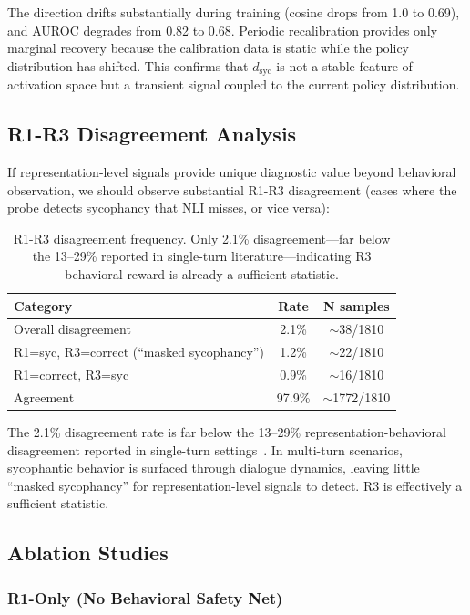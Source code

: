 \documentclass[11pt,a4paper]{article}
\begin{document}
The direction drifts substantially during training (cosine drops from 1.0 to 0.69), and AUROC degrades from 0.82 to 0.68. Periodic recalibration provides only marginal recovery because the calibration data is static while the policy distribution has shifted. This confirms that $d_\text{syc}$ is not a stable feature of activation space but a transient signal coupled to the current policy distribution.

\subsection{R1-R3 Disagreement Analysis}

If representation-level signals provide unique diagnostic value beyond behavioral observation, we should observe substantial R1-R3 disagreement (cases where the probe detects sycophancy that NLI misses, or vice versa):

\begin{table}[h]
\centering
\small
\begin{tabular}{lcc}
\toprule
\textbf{Category} & \textbf{Rate} & \textbf{N samples} \\
\midrule
Overall disagreement & 2.1\% & $\sim$38/1810 \\
R1=syc, R3=correct (``masked sycophancy'') & 1.2\% & $\sim$22/1810 \\
R1=correct, R3=syc & 0.9\% & $\sim$16/1810 \\
Agreement & 97.9\% & $\sim$1772/1810 \\
\bottomrule
\end{tabular}
\caption{R1-R3 disagreement frequency. Only 2.1\% disagreement---far below the 13--29\% reported in single-turn literature---indicating R3 behavioral reward is already a sufficient statistic.}
\label{tab:disagreement}
\end{table}

The 2.1\% disagreement rate is far below the 13--29\% representation-behavioral disagreement reported in single-turn settings~\cite{kadavath2022language}. In multi-turn scenarios, sycophantic behavior is surfaced through dialogue dynamics, leaving little ``masked sycophancy'' for representation-level signals to detect. R3 is effectively a sufficient statistic.

\subsection{Ablation Studies}

\subsubsection{R1-Only (No Behavioral Safety Net)}
\end{document}
